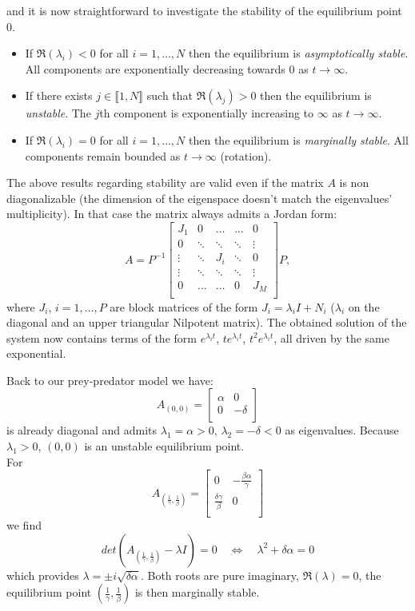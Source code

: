 and it is now straightforward to investigate the stability of the equilibrium point $0$.
\begin{itemize}
\item If $\Re (\lambda_i) <0$ for all $i = 1, \dots, N$ then the equilibrium is \textit{asymptotically stable}. All components are exponentially decreasing towards $0$ as $t \to \infty$.
\item If there exists $j \in \llbracket 1, N \rrbracket$ such that $\Re (\lambda_j) >0$ then the equilibrium is \textit{unstable}. The $j$th component is exponentially increasing to $\infty$ as $t \to \infty$.
\item If $\Re (\lambda_i) = 0$ for all $i = 1, \dots, N$ then the equilibrium is \textit{marginally stable}. All components remain bounded as $t \to \infty$ (rotation).
\end{itemize}

\begin{remark}
The above results regarding stability are valid even if the matrix $A$ is non diagonalizable (the dimension of the eigenspace doesn't match the eigenvalues' multiplicity). In that case the matrix always admits a Jordan form:
\[A = P^{-1} \begin{bmatrix}
J_1 & 0 & \dots & \dots  & 0  \\
0 & \ddots  & \ddots  & \ddots & \vdots  \\
 \vdots  & \ddots &J_i & \ddots  & 0\\
  \vdots  & \ddots  &\ddots & \ddots  & \vdots \\
0   & \dots & \dots  & 0 & J_M \\
\end{bmatrix} P,
\]
where $J_i$, $i = 1, \dots, P$ are block matrices of the form $J_i = \lambda_i I + N_i$ ($\lambda_i$ on the diagonal and an upper triangular Nilpotent matrix). The obtained solution of the system now contains terms of the form $ e^{\lambda_i t}$, $t e^{\lambda_i t}$, $t^2 e^{\lambda_i t}$, all driven by the same exponential.
\end{remark}

Back to our prey-predator model we have:
\[A_{(0,0)}  = \displaystyle  \begin{bmatrix}
\alpha & 0 \\
0&-\delta \\
\end{bmatrix} \]
is already diagonal and admits $\lambda_1 = \alpha >0$, $\lambda_2 = -\delta <0$ as eigenvalues. Because $\lambda_1 >0$, $(0,0)$ is an unstable equilibrium point. \\
For 
\[ A_{(\frac{1}{\gamma},\frac{1}{\beta})}=   \begin{bmatrix}
0& \displaystyle- \frac{\beta \alpha }{\gamma} \\
 \displaystyle\frac{\delta \gamma}{\beta}&0\\
\end{bmatrix} 
\]
we find 
\[ 
det (A_{(\frac{1}{\gamma},\frac{1}{\beta})} - \lambda I) = 0  \quad \Longleftrightarrow \quad \lambda^2 + \delta \alpha = 0
\]
which provides $\lambda = \pm i \sqrt{\delta \alpha}$. Both roots are pure imaginary, $\Re(\lambda) = 0$, the equilibrium point $(\frac{1}{\gamma},\frac{1}{\beta})$ is then marginally stable.


